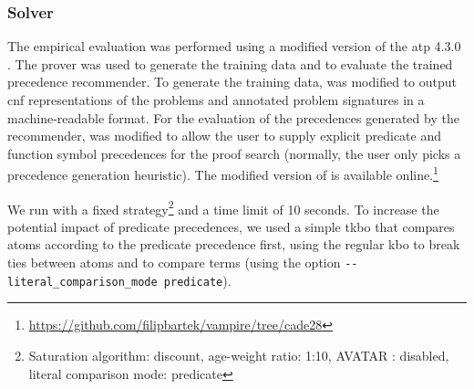 \subsubsection{Solver}

The empirical evaluation was performed using a modified version of the \gls{atp} \Vampire{} 4.3.0 \cite{DBLP:conf/cav/KovacsV13}.
The prover was used to generate the training data and to evaluate the trained precedence recommender.
To generate the training data,
\Vampire{} was modified to output \gls{cnf} representations of the problems
and annotated problem signatures in a machine-readable format.
For the evaluation of the precedences generated by the recommender,
\Vampire{} was modified to allow the user to supply explicit predicate and function symbol precedences for the proof search
(normally, the user only picks a precedence generation heuristic).
The modified version of \Vampire{} is available online.\footnote{\url{https://github.com/filipbartek/vampire/tree/cade28}}

We run \Vampire{} with a fixed strategy\footnote{
Saturation algorithm: discount,
age-weight ratio: 1:10,
AVATAR \cite{Voronkov2014}: disabled,
literal comparison mode: predicate
}
and a time limit of 10 seconds.
To increase the potential impact of predicate precedences,
we used a simple \gls{tkbo} \cite{Ludwig2007,Kovacs2011}
that compares atoms according to the predicate precedence first,
using the regular \gls{kbo} to break ties between atoms
and to compare terms (using the \Vampire{} option \texttt{-{}-literal\_comparison\_mode predicate}).



